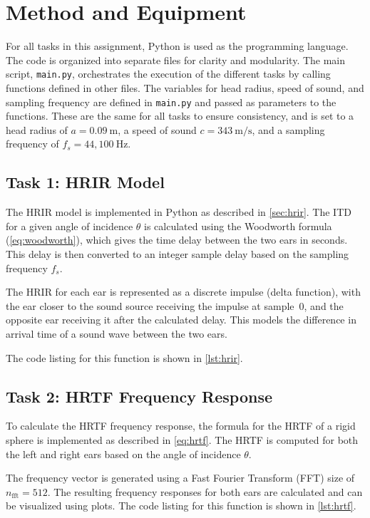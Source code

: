 \chapter{Method and Equipment}
\label{ch:method_equipment}

For all tasks in this assignment, Python is used as the programming language. The code is organized into separate files for clarity and modularity. The main script, \texttt{main.py}, orchestrates the execution of the different tasks by calling functions defined in other files. The variables for head radius, speed of sound, and sampling frequency are defined in \texttt{main.py} and passed as parameters to the functions. These are the same for all tasks to ensure consistency, and is set to a head radius of \( a = 0.09~\mathrm{m} \), a speed of sound \( c = 343~\mathrm{m/s} \), and a sampling frequency of \( f_s = 44{,}100~\mathrm{Hz} \).

\section{Task 1: HRIR Model}
\label{sec:task1}

The HRIR model is implemented in Python as described in \autoref{sec:hrir}. The ITD for a given angle of incidence \( \theta \) is calculated using the Woodworth formula (\autoref{eq:woodworth}), which gives the time delay between the two ears in seconds. This delay is then converted to an integer sample delay based on the sampling frequency \( f_s \).

The HRIR for each ear is represented as a discrete impulse (delta function), with the ear closer to the sound source receiving the impulse at sample~0, and the opposite ear receiving it after the calculated delay. This models the difference in arrival time of a sound wave between the two ears.

The code listing for this function is shown in \autoref{lst:hrir}.

\section{Task 2: HRTF Frequency Response}
\label{sec:task2}

To calculate the HRTF frequency response, the formula for the HRTF of a rigid sphere is implemented as described in \autoref{eq:hrtf}. The HRTF is computed for both the left and right ears based on the angle of incidence \( \theta \).

The frequency vector is generated using a Fast Fourier Transform (FFT) size of \( n_{\text{fft}} = 512 \). The resulting frequency responses for both ears are calculated and can be visualized using plots. The code listing for this function is shown in \autoref{lst:hrtf}.

